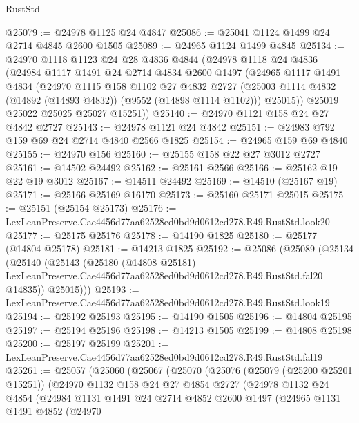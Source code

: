 \begin{lexlean}{RustStd}
\begin{coremodule}
@25079 := @24978 @1125 @24 @4847
@25086 := @25041 @1124 @1499 @24 @2714 @4845 @2600 @1505
@25089 := @24965 @1124 @1499 @4845
@25134 := @24970
    @1118
    @1123
    @24
    @28
    @4836
    @4844
    (@24978
      @1118
      @24
      @4836
      (@24984
        @1117
        @1491
        @24
        @2714
        @4834
        @2600
        @1497
        (@24965
          @1117
          @1491
          @4834
          (@24970
            @1115
            @158
            @1102
            @27
            @4832
            @2727
            (@25003 @1114 @4832 (@14892 (@14893 @4832)) (@9552 (@14898 @1114 @1102)))
            @25015))
        @25019
        @25022
        @25025
        @25027
        @15251))
@25140 := @24970 @1121 @158 @24 @27 @4842 @2727
@25143 := @24978 @1121 @24 @4842
@25151 := @24983 @792 @159 @69 @24 @2714 @4840 @2566 @1825
@25154 := @24965 @159 @69 @4840
@25155 := @24970 @156
@25160 := @25155 @158 @22 @27 @3012 @2727
@25161 := @14502 @24492
@25162 := @25161 @2566
@25166 := @25162 @19 @22 @19 @3012
@25167 := @14511 @24492
@25169 := @14510 (@25167 @19)
@25171 := @25166 @25169 @16170
@25173 := @25160 @25171 @25015
@25175 := @25151 (@25154 @25173)
@25176 := LexLeanPreserve.Cae4456d77aa62528ed0bd9d0612cd278.R49.RustStd.look20
@25177 := @25175 @25176
@25178 := @14190 @1825
@25180 := @25177 (@14804 @25178)
@25181 := @14213 @1825
@25192 := @25086
    (@25089
      (@25134
        (@25140
          (@25143
            (@25180
              (@14808 @25181)
              LexLeanPreserve.Cae4456d77aa62528ed0bd9d0612cd278.R49.RustStd.fal20
              @14835))
          @25015)))
@25193 := LexLeanPreserve.Cae4456d77aa62528ed0bd9d0612cd278.R49.RustStd.look19
@25194 := @25192 @25193
@25195 := @14190 @1505
@25196 := @14804 @25195
@25197 := @25194 @25196
@25198 := @14213 @1505
@25199 := @14808 @25198
@25200 := @25197 @25199
@25201 := LexLeanPreserve.Cae4456d77aa62528ed0bd9d0612cd278.R49.RustStd.fal19
@25261 := @25057
    (@25060
      (@25067
        (@25070
          (@25076
            (@25079 (@25200 @25201 @15251))
            (@24970
              @1132
              @158
              @24
              @27
              @4854
              @2727
              (@24978
                @1132
                @24
                @4854
                (@24984
                  @1131
                  @1491
                  @24
                  @2714
                  @4852
                  @2600
                  @1497
                  (@24965
                    @1131
                    @1491
                    @4852
                    (@24970

\end{coremodule}
\end{lexlean}
